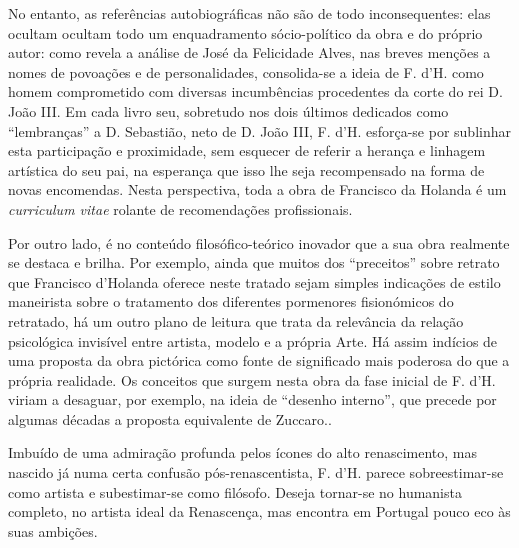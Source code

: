 \documentclass{article}
\begin{document}
No entanto, as referências autobiográficas não são de todo
inconsequentes: elas ocultam ocultam todo um enquadramento
sócio-político da obra e do próprio autor: como revela a análise de
José da Felicidade Alves, nas breves menções a nomes de povoações e de
personalidades, consolida-se a ideia de F. d'H. como homem
comprometido com diversas incumbências procedentes da corte do rei
D. João III. Em cada livro seu, sobretudo nos dois últimos dedicados
como ``lembranças'' a D. Sebastião, neto de D. João III,
F. d'H. esforça-se por sublinhar esta participação e proximidade, sem
esquecer de referir a herança e linhagem artística do seu pai, na
esperança que isso lhe seja recompensado na forma de novas
encomendas. Nesta perspectiva, toda a obra de Francisco da Holanda é
um \emph{curriculum vitae} rolante de recomendações profissionais.

Por outro lado, é no conteúdo filosófico-teórico inovador que a sua
obra realmente se destaca e brilha. Por exemplo, ainda que muitos dos
``preceitos'' sobre retrato que Francisco d'Holanda oferece neste
tratado sejam simples indicações de estilo maneirista sobre o
tratamento dos diferentes pormenores fisionómicos do retratado, há um
outro plano de leitura que trata da relevância da relação psicológica
invisível entre artista, modelo e a própria Arte. Há assim indícios de
uma proposta da obra pictórica como fonte de significado mais poderosa
do que a própria realidade. Os conceitos que surgem nesta obra da fase
inicial de F. d'H. viriam a desaguar, por exemplo, na ideia de
``desenho interno'', que precede por algumas décadas a proposta
equivalente de Zuccaro.\cite{holanda-desenho}.

Imbuído de uma admiração profunda pelos ícones do alto renascimento,
mas nascido já numa certa confusão pós-renascentista, F. d'H. parece
sobreestimar-se como artista e subestimar-se como filósofo. Deseja
tornar-se no humanista completo, no artista ideal da Renascença, mas
encontra em Portugal pouco eco às suas ambições.

\printbibliography[heading=bibliography,title={Bibliografia}]
\end{document}
